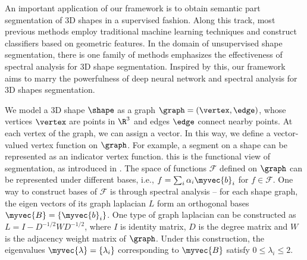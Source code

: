 \label{sec:related}
An important application of our framework is to obtain semantic part segmentation of 3D shapes in a supervised fashion. Along this track, most previous methods \cite{kalogerakis2010learning,xie20143d,makadia2014learning,guo20153d} employ traditional machine learning techniques and construct classifiers based on geometric features.
In the domain of unsupervised shape segmentation, there is one family of methods \cite{liu2004segmentation,liu2007mesh} emphasizes the effectiveness of spectral analysis for 3D shape segmentation. Inspired by this, our framework aims to marry the powerfulness of deep neural network and spectral analysis for 3D shapes segmentation.
\iffalse
\todo{
  \begin{itemize}
    \item brief review existing works on 3d shape segmentation
    \item emphasize the family of spectral methods based shape segmentation papers. make it clear that the intrinsic property is extremely important for 3d shape segmenentation, in contrast to 2d segmentation. 
  \end{itemize}
}
\fi

We model a 3D shape $\shape$ as a graph $\graph=(\vertex,\edge)$, whose vertices $\vertex$ are points in $\R^3$ and edges $\edge$ connect nearby points. At each vertex of the graph, we can assign a vector. In this way, we define a vector-valued vertex function on $\graph$. For example, a segment on a shape can be represented as an indicator vertex function. this is the functional view of segmentation, as introduced in \cite{wang2013image,wang2014unsupervised}. The space of functions $\mathcal{F}$ defined on $\graph$ can be represented under different bases, i.e., $f=\sum_i \alpha_i \myvec{b}_i$ for $f\in\mathcal{F}$. One way to construct bases of $\mathcal{F}$ is through spectral analysis -- for each shape graph, the eigen vectors of its graph laplacian $L$ form an orthogonal bases $\myvec{B} = \{\myvec{b}_i\}$. One type of graph laplacian can be constructed as $L=I-D^{-1/2}WD^{-1/2}$, where $I$ is identity matrix, $D$ is the degree matrix and $W$ is the adjacency weight matrix of $\graph$. Under this construction, the eigenvalues $\myvec{\lambda}=\{\lambda_i\}$ corresponding to $\myvec{B}$ satisfy $0\le \lambda_i\le2$.

